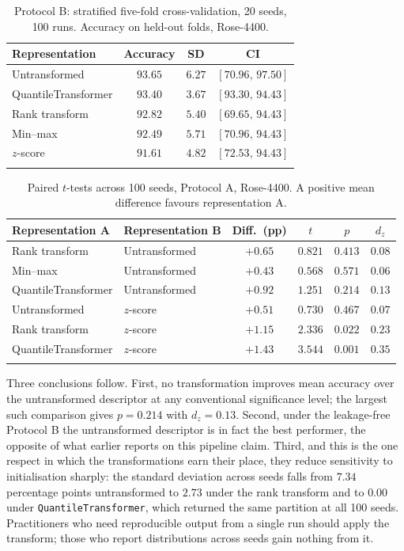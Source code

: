 \documentclass[pdflatex,sn-basic]{sn-jnl}
\theoremstyle{thmstyleone}%
\theoremstyle{thmstyletwo}%
\theoremstyle{thmstylethree}%
\begin{document}
\begin{table}[h]
\centering
\caption{Protocol B: stratified five-fold cross-validation, 20 seeds, 100 runs.
Accuracy on held-out folds, Rose-4400.}\label{tab:protocolB}
\begin{tabular}{@{}lccc@{}}
\toprule
Representation & Accuracy & SD & CI \\
\midrule
Untransformed       & $\mathbf{93.65}$ & $6.27$ & $[70.96,\,97.50]$ \\
QuantileTransformer & $93.40$ & $3.67$ & $[93.30,\,94.43]$ \\
Rank transform      & $92.82$ & $5.40$ & $[69.65,\,94.43]$ \\
Min--max            & $92.49$ & $5.71$ & $[70.96,\,94.43]$ \\
$z$-score           & $91.61$ & $4.82$ & $[72.53,\,94.43]$ \\
\botrule
\end{tabular}
\end{table}

\begin{table}[h]
\centering
\caption{Paired $t$-tests across 100 seeds, Protocol A, Rose-4400. A positive
mean difference favours representation A.}\label{tab:ttest}
\begin{tabular}{@{}llcccc@{}}
\toprule
Representation A & Representation B & Diff.\ (pp) & $t$ & $p$ & $d_z$ \\
\midrule
Rank transform      & Untransformed & $+0.65$ & $0.821$ & $0.413$ & $0.08$ \\
Min--max            & Untransformed & $+0.43$ & $0.568$ & $0.571$ & $0.06$ \\
QuantileTransformer & Untransformed & $+0.92$ & $1.251$ & $0.214$ & $0.13$ \\
Untransformed       & $z$-score     & $+0.51$ & $0.730$ & $0.467$ & $0.07$ \\
Rank transform      & $z$-score     & $+1.15$ & $2.336$ & $0.022$ & $0.23$ \\
QuantileTransformer & $z$-score     & $+1.43$ & $3.544$ & $0.001$ & $0.35$ \\
\botrule
\end{tabular}
\end{table}

Three conclusions follow. First, no transformation improves mean accuracy over
the untransformed descriptor at any conventional significance level; the
largest such comparison gives $p=0.214$ with $d_z=0.13$. Second, under the
leakage-free Protocol B the untransformed descriptor is in fact the best
performer, the opposite of what earlier reports on this pipeline claim. Third,
and this is the one respect in which the transformations earn their place, they
reduce sensitivity to initialisation sharply: the standard deviation across
seeds falls from $7.34$ percentage points untransformed to $2.73$ under the
rank transform and to $0.00$ under \texttt{QuantileTransformer}, which returned
the same partition at all 100 seeds. Practitioners who need reproducible output
from a single run should apply the transform; those who report distributions
across seeds gain nothing from it.
\end{document}
